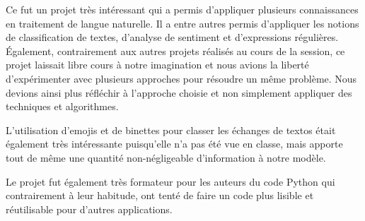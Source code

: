 Ce fut un projet très intéressant qui a permis d'appliquer plusieurs connaissances en traitement de langue naturelle. Il a entre autres permis d'appliquer les notions de classification de textes, d'analyse de sentiment et d'expressions régulières.
Également, contrairement aux autres projets réalisés au cours de la session, ce projet laissait libre cours à notre imagination et nous avions la liberté d'expérimenter avec plusieurs approches pour résoudre un même problème. Nous devions ainsi plus réfléchir à l'approche choisie et non simplement appliquer des techniques et algorithmes.

L'utilisation d'emojis et de binettes pour classer les échanges de textos était également très intéressante puisqu'elle n'a pas été vue en classe, mais apporte tout de même une quantité non-négligeable d'information à notre modèle.

Le projet fut également très formateur pour les auteurs du code Python qui contrairement à leur habitude, ont tenté de faire un code plus lisible et réutilisable pour d'autres applications. 
